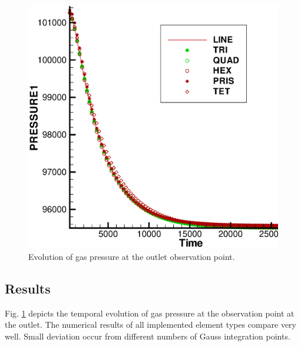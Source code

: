 \begin{figure}[htb!]
\center
\includegraphics[scale=0.3]{PART_II/G/gas_flow.eps}
\caption{Evolution of gas pressure at the outlet observation point.}
\label{fig:gas_flow}
\end{figure}
\subsection{Results}
Fig. \ref{fig:gas_flow} depicts the temporal evolution of gas pressure at the observation point at the outlet. The numerical results of all implemented element types compare very well. Small deviation occur from different numbers of Gauss integration points.
